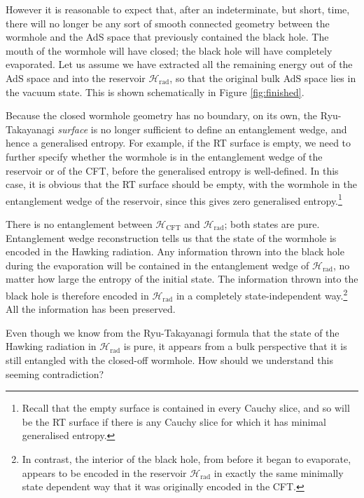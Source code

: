 \documentclass[11pt,a4paper]{article}
\begin{document}
However it is reasonable to expect that, after an indeterminate, but short, time, there will no longer be any sort of smooth connected geometry between the wormhole and the AdS space that previously contained the black hole. The mouth of the wormhole will have closed; the black hole will have completely evaporated. Let us assume we have extracted all the remaining energy out of the AdS space and into the reservoir $\mathcal{H}_\text{rad}$, so that the original bulk AdS space lies in the vacuum state. This is shown schematically in Figure \ref{fig:finished}.

Because the closed wormhole geometry has no boundary, on its own, the Ryu-Takayanagi \emph{surface} is no longer sufficient to define an entanglement wedge, and hence a generalised entropy. For example, if the RT surface is empty, we need to further specify whether the wormhole is in the entanglement wedge of the reservoir or of the CFT, before the generalised entropy is well-defined. In this case, it is obvious that the RT surface should be empty, with the wormhole in the entanglement wedge of the reservoir, since this gives zero generalised entropy.\footnote{Recall that the empty surface is contained in every Cauchy slice, and so will be the RT surface if there is any Cauchy slice for which it has minimal generalised entropy.}

There is no entanglement between $\mathcal{H}_\text{CFT}$ and $\mathcal{H}_\text{rad}$; both states are pure. Entanglement wedge reconstruction tells us that the state of the wormhole is encoded in the Hawking radiation. Any information thrown into the black hole during the evaporation will be contained in the entanglement wedge of $\mathcal{H}_\text{rad}$, no matter how large the entropy of the initial state. The information thrown into the black hole is therefore encoded in $\mathcal{H}_\text{rad}$ in a completely state-independent way.\footnote{In contrast, the interior of the black hole, from before it began to evaporate, appears to be encoded in the reservoir $\mathcal{H}_\text{rad}$ in exactly the same minimally state dependent way that it was originally encoded in the CFT.} All the information has been preserved.

Even though we know from the Ryu-Takayanagi formula that the state of the Hawking radiation in $\mathcal{H}_\text{rad}$ is pure, it appears from a bulk perspective that it is still entangled with the closed-off wormhole. How should we understand this seeming contradiction? 
\end{document}
